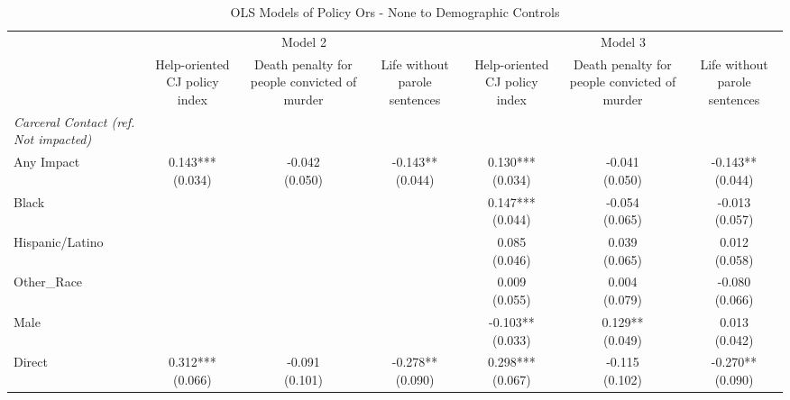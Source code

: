 \begin{table}[!htbp]
\centering
\caption{OLS Models of Policy Ors - None to Demographic Controls}
\label{tab:carceral\_policy\_ors\_nocontrol\_demo}
\begin{threeparttable}
\begin{tabular}{lcccccc}
\toprule
 & \multicolumn{3}{c}{Model 2} & \multicolumn{3}{c}{Model 3}
 \\
\cmidrule(lr){2-4} \cmidrule(lr){5-7}
 & Help-oriented CJ policy index & Death penalty for people convicted of murder & Life without parole sentences & Help-oriented CJ policy index & Death penalty for people convicted of murder & Life without parole sentences
 \\
\midrule
\textit{Carceral Contact (ref. Not impacted)} &  &  &  &  &  & 
\\
Any Impact & \makecell[c]{0.143*** \\ (0.034)} & \makecell[c]{-0.042 \\ (0.050)} & \makecell[c]{-0.143** \\ (0.044)} & \makecell[c]{0.130*** \\ (0.034)} & \makecell[c]{-0.041 \\ (0.050)} & \makecell[c]{-0.143** \\ (0.044)} \\
Black &  &  &  & \makecell[c]{0.147*** \\ (0.044)} & \makecell[c]{-0.054 \\ (0.065)} & \makecell[c]{-0.013 \\ (0.057)} \\
Hispanic/Latino &  &  &  & \makecell[c]{0.085 \\ (0.046)} & \makecell[c]{0.039 \\ (0.065)} & \makecell[c]{0.012 \\ (0.058)} \\
Other\_Race &  &  &  & \makecell[c]{0.009 \\ (0.055)} & \makecell[c]{0.004 \\ (0.079)} & \makecell[c]{-0.080 \\ (0.066)} \\
Male &  &  &  & \makecell[c]{-0.103** \\ (0.033)} & \makecell[c]{0.129** \\ (0.049)} & \makecell[c]{0.013 \\ (0.042)} \\
\addlinespace
Direct & \makecell[c]{0.312*** \\ (0.066)} & \makecell[c]{-0.091 \\ (0.101)} & \makecell[c]{-0.278** \\ (0.090)} & \makecell[c]{0.298*** \\ (0.067)} & \makecell[c]{-0.115 \\ (0.102)} & \makecell[c]{-0.270** \\ (0.090)} \\

\end{tabular}
\end{threeparttable}
\end{table}
